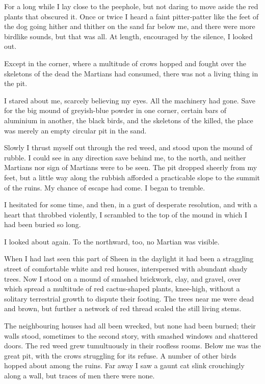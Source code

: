 For a long while I lay close to the peephole, but not daring to
move aside the red plants that obscured it. Once or twice I heard a
faint pitter-patter like the feet of the dog going hither and
thither on the sand far below me, and there were more birdlike
sounds, but that was all. At length, encouraged by the silence, I
looked out.

Except in the corner, where a multitude of crows hopped and fought
over the skeletons of the dead the Martians had consumed, there was
not a living thing in the pit.

I stared about me, scarcely believing my eyes. All the machinery
had gone. Save for the big mound of greyish-blue powder in one
corner, certain bars of aluminium in another, the black birds, and
the skeletons of the killed, the place was merely an empty circular
pit in the sand.

Slowly I thrust myself out through the red weed, and stood upon the
mound of rubble. I could see in any direction save behind me, to
the north, and neither Martians nor sign of Martians were to be
seen. The pit dropped sheerly from my feet, but a little way along
the rubbish afforded a practicable slope to the summit of the
ruins. My chance of escape had come. I began to tremble.

I hesitated for some time, and then, in a gust of desperate
resolution, and with a heart that throbbed violently, I scrambled
to the top of the mound in which I had been buried so long.

I looked about again. To the northward, too, no Martian was
visible.

When I had last seen this part of Sheen in the daylight it had been
a straggling street of comfortable white and red houses,
interspersed with abundant shady trees. Now I stood on a mound of
smashed brickwork, clay, and gravel, over which spread a multitude
of red cactus-shaped plants, knee-high, without a solitary
terrestrial growth to dispute their footing. The trees near me were
dead and brown, but further a network of red thread scaled the
still living stems.

The neighbouring houses had all been wrecked, but none had been
burned; their walls stood, sometimes to the second story, with
smashed windows and shattered doors. The red weed grew tumultuously
in their roofless rooms. Below me was the great pit, with the crows
struggling for its refuse. A number of other birds hopped about
among the ruins. Far away I saw a gaunt cat slink crouchingly along
a wall, but traces of men there were none.

